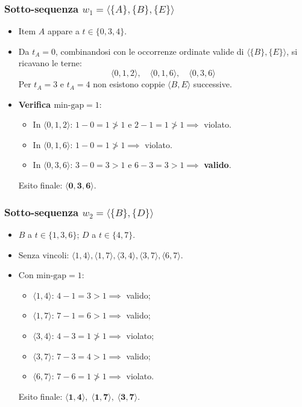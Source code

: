\subsubsection{Sotto-sequenza \texorpdfstring{$w_1 = \langle \{A\}, \{B\}, \{E\} \rangle$}{w1}}
\begin{itemize}
    \item Item $A$ appare a $t \in \{0, 3, 4\}$.
    \item Da $t_A = 0$, combinandosi con le occorrenze ordinate valide di $\langle \{B\}, \{E\} \rangle$, si ricavano le terne:
    \begin{equation}
    \langle 0, 1, 2 \rangle, \quad \langle 0, 1, 6 \rangle, \quad \langle 0, 3, 6 \rangle
    \end{equation}
    Per $t_A = 3$ e $t_A = 4$ non esistono coppie $\langle B, E \rangle$ successive.
    \item \textbf{Verifica $\text{min-gap} = 1$}:
    \begin{itemize}
        \item In $\langle 0, 1, 2 \rangle$: $1 - 0 = 1 \ngtr 1$ e $2 - 1 = 1 \ngtr 1 \implies$ violato.
        \item In $\langle 0, 1, 6 \rangle$: $1 - 0 = 1 \ngtr 1 \implies$ violato.
        \item In $\langle 0, 3, 6 \rangle$: $3 - 0 = 3 > 1$ e $6 - 3 = 3 > 1 \implies$ \textbf{valido}.
    \end{itemize}
    Esito finale: $\mathbf{\langle 0, 3, 6 \rangle}$.
\end{itemize}

\FloatBarrier
\subsubsection{Sotto-sequenza \texorpdfstring{$w_2 = \langle \{B\}, \{D\} \rangle$}{w2}}
\begin{itemize}
    \item $B$ a $t \in \{1, 3, 6\}$; $D$ a $t \in \{4, 7\}$.
    \item Senza vincoli: $\langle 1, 4 \rangle, \langle 1, 7 \rangle, \langle 3, 4 \rangle, \langle 3, 7 \rangle, \langle 6, 7 \rangle$.
    \item Con $\text{min-gap} = 1$:
    \begin{itemize}
        \item $\langle 1, 4 \rangle$: $4 - 1 = 3 > 1 \implies$ valido;
        \item $\langle 1, 7 \rangle$: $7 - 1 = 6 > 1 \implies$ valido;
        \item $\langle 3, 4 \rangle$: $4 - 3 = 1 \ngtr 1 \implies$ violato;
        \item $\langle 3, 7 \rangle$: $7 - 3 = 4 > 1 \implies$ valido;
        \item $\langle 6, 7 \rangle$: $7 - 6 = 1 \ngtr 1 \implies$ violato.
    \end{itemize}
    Esito finale: $\mathbf{\langle 1, 4 \rangle, \; \langle 1, 7 \rangle, \; \langle 3, 7 \rangle}$.
\end{itemize}

